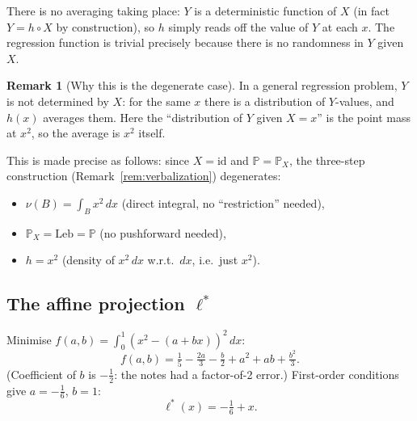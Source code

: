 \documentclass[12pt, a4paper]{article}
\theoremstyle{definition}
\newtheorem{remark}{Remark}[section]
\newcommand{\Prob}{\mathbb{P}}
\newcommand{\Leb}{\mathrm{Leb}}
\begin{document}
There is no averaging taking place: $Y$ is a deterministic function
of $X$ (in fact $Y=h\circ X$ by construction), so $h$ simply reads
off the value of $Y$ at each $x$.  The regression function is
trivial precisely because there is no randomness in $Y$ given $X$.

\begin{remark}[Why this is the degenerate case]
In a general regression problem, $Y$ is not determined by $X$:
for the same $x$ there is a distribution of $Y$-values, and $h(x)$
averages them.  Here the ``distribution of $Y$ given $X=x$'' is the
point mass at $x^2$, so the average is $x^2$ itself.

This is made precise as follows: since $X=\mathrm{id}$ and
$\Prob=\Prob_X$, the three-step construction (Remark~\ref{rem:verbalization})
degenerates:
\begin{itemize}
  \item $\nu(B)=\int_B x^2\,dx$ (direct integral, no ``restriction'' needed),
  \item $\Prob_X=\Leb=\Prob$ (no pushforward needed),
  \item $h=x^2$ (density of $x^2\,dx$ w.r.t.\ $dx$, i.e.\ just $x^2$).
\end{itemize}
\end{remark}

\subsection{The affine projection $\ell^*$}

Minimise $f(a,b)=\int_0^1(x^2-(a+bx))^2\,dx$:
\[
  f(a,b)
  =\tfrac{1}{5}-\tfrac{2a}{3}-\tfrac{b}{2}+a^2+ab+\tfrac{b^2}{3}.
\]
(Coefficient of $b$ is $-\tfrac{1}{2}$: the notes had a
factor-of-2 error.)
First-order conditions give $a=-\tfrac{1}{6}$, $b=1$:
\[
  \boxed{\ell^*(x) = -\tfrac{1}{6}+x.}
\]

\medskip
\begin{center}
\end{center}
\medskip
\end{document}
